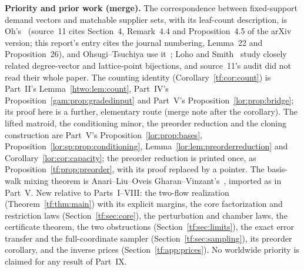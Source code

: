 \documentclass[11pt]{article}
\numberwithin{equation}{section}
\theoremstyle{definition}
\begin{document}
\begin{statusbox}
\small\textbf{Priority and prior work (merge).}
The correspondence between fixed-support demand vectors and matchable
supplier sets, with its leaf-count description, is Oh's~\cite{Oh}
(source~11 cites Section~4, Remark~4.4 and Proposition~4.5 of the arXiv
version; this report's entry cites the journal numbering, Lemma~22 and
Proposition~26), and Ohsugi--Tsuchiya use it~\cite{OT20}; Loho and
Smith~\cite{LohoSmith} study closely related degree-vector and
lattice-point bijections, and source~11's audit did not read their whole
paper. The counting identity (Corollary~\ref{tf:cor:count}) is Part~II's
Lemma~\ref{htwo:lem:count}, Part~IV's
Proposition~\ref{gam:prop:gradedinput} and Part~V's
Proposition~\ref{lor:prop:bridge}; its proof here is a further, elementary
route (merge note after the corollary). The lifted matroid, the
conditioning minor, the preorder reduction and the cloning construction
are Part~V's Proposition~\ref{lor:prop:bases},
Proposition~\ref{lor:sp:prop:conditioning},
Lemma~\ref{lor:lem:preorderreduction} and
Corollary~\ref{lor:cor:capacity}; the preorder reduction is printed once,
as Proposition~\ref{tf:prop:preorder}, with its proof replaced by a
pointer. The basis-walk mixing theorem is
Anari--Liu--Oveis Gharan--Vinzant's~\cite{ALOV}, imported as in Part~V.
New relative to Parts~I--VIII: the two-flow realization
(Theorem~\ref{tf:thm:main}) with its explicit margins, the core
factorization and restriction laws (Section~\ref{tf:sec:core}), the
perturbation and chamber laws, the certificate theorem, the two
obstructions (Section~\ref{tf:sec:limits}), the exact error transfer and
the full-coordinate sampler (Section~\ref{tf:sec:sampling}), its
preorder corollary, and the inverse prices (Section~\ref{tf:app:prices}).
No worldwide priority is claimed for any result of Part~IX.
\end{statusbox}
\end{document}
